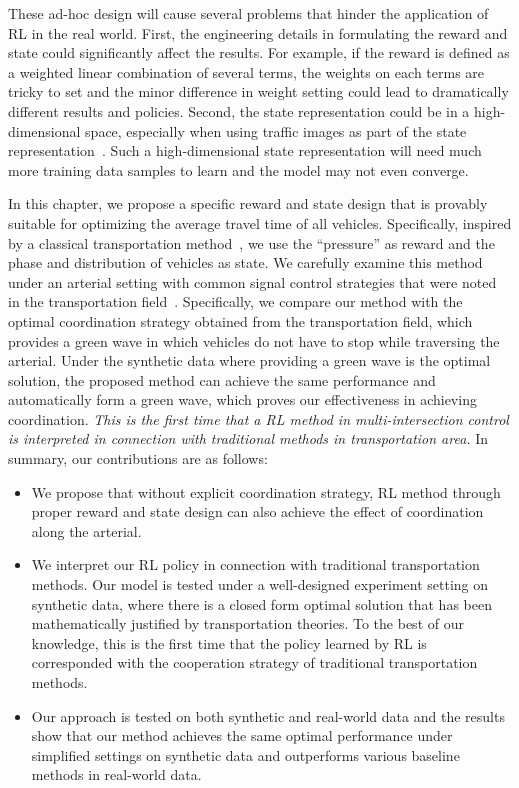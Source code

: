 These ad-hoc design will cause several problems that hinder the application of RL in the real world. First, the engineering details in formulating the reward and state could significantly affect the results. For example, if the reward is defined as a weighted linear combination of several terms, the weights on each terms are tricky to set and the minor difference in weight setting could lead to dramatically different results and policies. Second, the state representation could be in a high-dimensional space, especially when using traffic images as part of the state representation~\cite{VaOl16,wei2018intellilight}. Such a high-dimensional state representation will need much more training data samples to learn and the model may not even converge.

In this chapter, we propose a specific reward and state design that is provably suitable for optimizing the average travel time of all vehicles. Specifically, inspired by a classical transportation method~\cite{MP13}, we use the ``pressure'' as reward and the phase and distribution of vehicles as state. We carefully examine this method under an arterial setting with common signal control strategies that were noted in the transportation field~\cite{newell1981blocking}. Specifically, we compare our method with the optimal coordination strategy obtained from the transportation field, which provides a green wave in which vehicles do not have to stop while traversing the arterial. Under the synthetic data where providing a green wave is the optimal solution, the proposed method can achieve the same performance and automatically form a green wave, which proves our effectiveness in achieving coordination. \textit{This is the first time that a RL method in multi-intersection control is interpreted in connection with traditional methods in transportation area.} In summary, our contributions are as follows:
\begin{itemize}
\item We propose that without explicit coordination strategy, RL method through proper reward and state design can also achieve the effect of coordination along the arterial. 
\item We interpret our RL policy in connection with traditional transportation methods. Our model is tested under a well-designed experiment setting on synthetic data, where there is a closed form optimal solution that has been mathematically justified by transportation theories. To the best of our knowledge, this is the first time that the policy learned by RL is corresponded with the cooperation strategy of traditional transportation methods.
\item Our approach is tested on both synthetic and real-world data and the results show that our method achieves the same optimal performance under simplified settings on synthetic data and outperforms various baseline methods in real-world data.
\end{itemize}

